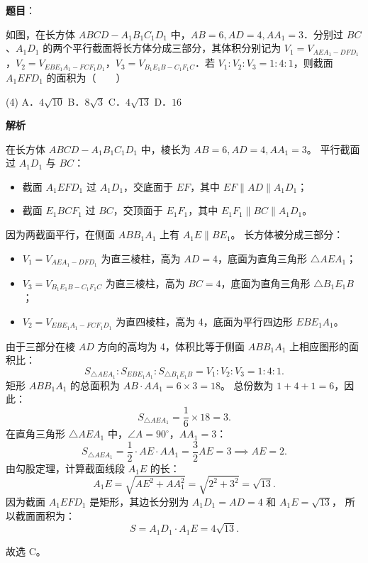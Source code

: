 \begin{answer}

\textbf{题目}：

如图，在长方体 $ABCD - A_1B_1C_1D_1$ 中，$AB = 6, AD = 4, AA_1 = 3$．分别过 $BC$、$A_1D_1$ 的两个平行截面将长方体分成三部分，其体积分别记为 $V_1 = V_{AEA_1-DFD_1}$，$V_2 = V_{EBE_1A_1-FCF_1D_1}$，$V_3 = V_{B_1E_1B-C_1F_1C}$．若 $V_1 : V_2 : V_3 = 1 : 4 : 1$，则截面 $A_1EFD_1$ 的面积为\mbox{（　　）}
\nopagebreak[4]
\begin{center}\end{center}
\nopagebreak[4]
\begin{gkopts}(4)
\task A．$4\sqrt{10}$
\task B．$8\sqrt{3}$
\task C．$4\sqrt{13}$
\task D．$16$
\end{gkopts}

\textbf{解析}
\nopagebreak[4]
\begin{center}\end{center}
\nopagebreak[4]
在长方体 $ABCD - A_1B_1C_1D_1$ 中，棱长为 $AB = 6, AD = 4, AA_1 = 3$。
平行截面过 $A_1D_1$ 与 $BC$：
\begin{itemize}
\item 截面 $A_1EFD_1$ 过 $A_1D_1$，交底面于 $EF$，其中 $EF \parallel AD \parallel A_1D_1$；
\item 截面 $E_1BCF_1$ 过 $BC$，交顶面于 $E_1F_1$，其中 $E_1F_1 \parallel BC \parallel A_1D_1$。
\end{itemize}
因为两截面平行，在侧面 $ABB_1A_1$ 上有 $A_1E \parallel BE_1$。
长方体被分成三部分：
\begin{itemize}
\item $V_1 = V_{AEA_1-DFD_1}$ 为直三棱柱，高为 $AD = 4$，底面为直角三角形 $\triangle AEA_1$；
\item $V_3 = V_{B_1E_1B-C_1F_1C}$ 为直三棱柱，高为 $BC = 4$，底面为直角三角形 $\triangle B_1E_1B$；
\item $V_2 = V_{EBE_1A_1-FCF_1D_1}$ 为直四棱柱，高为 4，底面为平行四边形 $EBE_1A_1$。
\end{itemize}
由于三部分在棱 $AD$ 方向的高均为 4，体积比等于侧面 $ABB_1A_1$ 上相应图形的面积比：
\nopagebreak[4]
\[
S_{\triangle AEA_1} : S_{EBE_1A_1} : S_{\triangle B_1E_1B} = V_1 : V_2 : V_3 = 1 : 4 : 1.
\]
矩形 $ABB_1A_1$ 的总面积为 $AB \cdot AA_1 = 6 \times 3 = 18$。
总份数为 $1 + 4 + 1 = 6$，因此：
\nopagebreak[4]
\[
S_{\triangle AEA_1} = \dfrac{1}{6} \times 18 = 3.
\]
在直角三角形 $\triangle AEA_1$ 中，$\angle A = 90^\circ$，$AA_1 = 3$：
\nopagebreak[4]
\[
S_{\triangle AEA_1} = \dfrac{1}{2} \cdot AE \cdot AA_1 = \dfrac{3}{2}AE = 3 \implies AE = 2.
\]
由勾股定理，计算截面线段 $A_1E$ 的长：
\nopagebreak[4]
\[
A_1E = \sqrt{AE^2 + AA_1^2} = \sqrt{2^2 + 3^2} = \sqrt{13}.
\]
因为截面 $A_1EFD_1$ 是矩形，其边长分别为 $A_1D_1 = AD = 4$ 和 $A_1E = \sqrt{13}$，
所以截面面积为：
\nopagebreak[4]
\[
S = A_1D_1 \cdot A_1E = 4\sqrt{13}.
\]

故选 C。


\end{answer}
